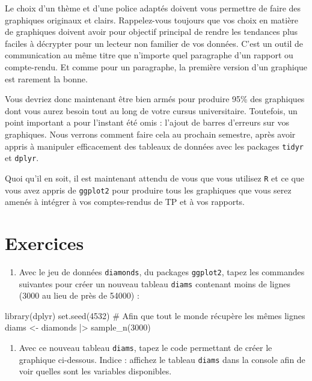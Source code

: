 \documentclass[
  a4paper,
  DIV=11,
  numbers=noendperiod,
  oneside]{scrreprt}
\newenvironment{Shaded}{}{}
\newcommand{\CommentTok}[1]{\textcolor[rgb]{0.42,0.45,0.49}{#1}}
\newcommand{\DecValTok}[1]{\textcolor[rgb]{0.00,0.36,0.77}{#1}}
\newcommand{\FunctionTok}[1]{\textcolor[rgb]{0.44,0.26,0.76}{#1}}
\newcommand{\NormalTok}[1]{\textcolor[rgb]{0.14,0.16,0.18}{#1}}
\newcommand{\OtherTok}[1]{\textcolor[rgb]{0.44,0.26,0.76}{#1}}
\newcommand{\SpecialCharTok}[1]{\textcolor[rgb]{0.00,0.36,0.77}{#1}}
\providecommand{\tightlist}{%
  \setlength{\itemsep}{0pt}\setlength{\parskip}{0pt}}\usepackage{longtable,booktabs,array}
\begin{document}
Le choix d'un thème et d'une police adaptés doivent vous permettre de
faire des graphiques originaux et clairs. Rappelez-vous toujours que vos
choix en matière de graphiques doivent avoir pour objectif principal de
rendre les tendances plus faciles à décrypter pour un lecteur non
familier de vos données. C'est un outil de communication au même titre
que n'importe quel paragraphe d'un rapport ou compte-rendu. Et comme
pour un paragraphe, la première version d'un graphique est rarement la
bonne.

Vous devriez donc maintenant être bien armés pour produire 95\% des
graphiques dont vous aurez besoin tout au long de votre cursus
universitaire. Toutefois, un point important a pour l'instant été omis :
l'ajout de barres d'erreurs sur vos graphiques. Nous verrons comment
faire cela au prochain semestre, après avoir appris à manipuler
efficacement des tableaux de données avec les packages \texttt{tidyr} et
\texttt{dplyr}.

Quoi qu'il en soit, il est maintenant attendu de vous que vous utilisez
\texttt{R} et ce que vous avez appris de \texttt{ggplot2} pour produire
tous les graphiques que vous serez amenés à intégrer à vos
comptes-rendus de TP et à vos rapports.

\section{Exercices}\label{exercices}

\begin{enumerate}
\def\labelenumi{\arabic{enumi}.}
\tightlist
\item
  Avec le jeu de données \texttt{diamonds}, du packages
  \texttt{ggplot2}, tapez les commandes suivantes pour créer un nouveau
  tableau \texttt{diams} contenant moins de lignes (3000 au lieu de près
  de 54000) :
\end{enumerate}

\begin{Shaded}
\begin{Highlighting}[]
\FunctionTok{library}\NormalTok{(dplyr)}
\FunctionTok{set.seed}\NormalTok{(}\DecValTok{4532}\NormalTok{) }\CommentTok{\# Afin que tout le monde récupère les mêmes lignes}
\NormalTok{diams }\OtherTok{\textless{}{-}}\NormalTok{ diamonds }\SpecialCharTok{|\textgreater{}}
  \FunctionTok{sample\_n}\NormalTok{(}\DecValTok{3000}\NormalTok{)}
\end{Highlighting}
\end{Shaded}

\begin{enumerate}
\def\labelenumi{\arabic{enumi}.}
\setcounter{enumi}{1}
\tightlist
\item
  Avec ce nouveau tableau \texttt{diams}, tapez le code permettant de
  créer le graphique ci-dessous. Indice : affichez le tableau
  \texttt{diams} dans la console afin de voir quelles sont les variables
  disponibles.
\end{enumerate}
\end{document}
